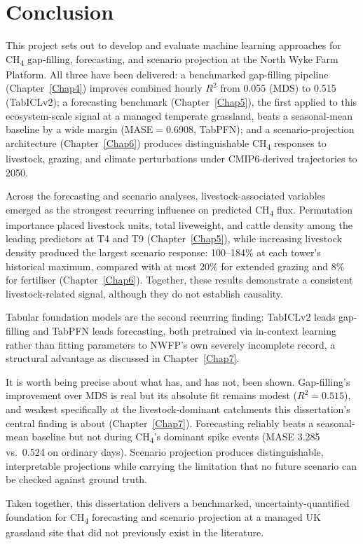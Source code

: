 \chapter{Conclusion} \label{Chap8}

This project sets out to develop and evaluate
machine learning approaches for CH\textsubscript{4} gap-filling, forecasting, and scenario
projection at the North Wyke Farm Platform. All three have been delivered: a benchmarked
gap-filling pipeline (Chapter~\ref{Chap4}) improves combined hourly $R^2$ from 0.055 (MDS) to
0.515 (TabICLv2); a forecasting benchmark (Chapter~\ref{Chap5}), the first applied to this
ecosystem-scale signal at a managed temperate grassland, beats a seasonal-mean baseline by a wide
margin (MASE$=$0.6908, TabPFN); and a scenario-projection architecture (Chapter~\ref{Chap6})
produces distinguishable CH\textsubscript{4} responses to livestock, grazing, and climate
perturbations under CMIP6-derived trajectories to 2050.

Across the forecasting and scenario analyses, livestock-associated variables
emerged as the strongest recurring influence on predicted
CH\textsubscript{4} flux. Permutation importance placed livestock units, total
liveweight, and cattle density among the leading predictors at T4 and T9
(Chapter~\ref{Chap5}), while increasing livestock density produced the largest
scenario response: 100--184\% at each tower's historical maximum, compared
with at most 20\% for extended grazing and 8\% for fertiliser
(Chapter~\ref{Chap6}). Together, these results demonstrate a consistent
livestock-related signal, although they do not establish causality.

Tabular foundation models are the second recurring finding: TabICLv2 leads gap-filling and TabPFN
leads forecasting, both pretrained via in-context learning rather than fitting parameters to
NWFP's own severely incomplete record, a structural advantage as discussed in
Chapter~\ref{Chap7}.

It is worth being precise about what has, and has not, been shown. Gap-filling's improvement over
MDS is real but its absolute fit remains modest ($R^2=0.515$), and weakest specifically at the
livestock-dominant catchments this dissertation's central finding is about (Chapter~\ref{Chap7}).
Forecasting reliably beats a seasonal-mean baseline but not during CH\textsubscript{4}'s dominant
spike events (MASE 3.285 vs.\ 0.524 on ordinary days). Scenario projection produces
distinguishable, interpretable projections while carrying the limitation that no future scenario
can be checked against ground truth. 

Taken together, this dissertation delivers a benchmarked,
uncertainty-quantified foundation for CH\textsubscript{4} forecasting and scenario projection at a
managed UK grassland site that did not previously exist in the literature.
